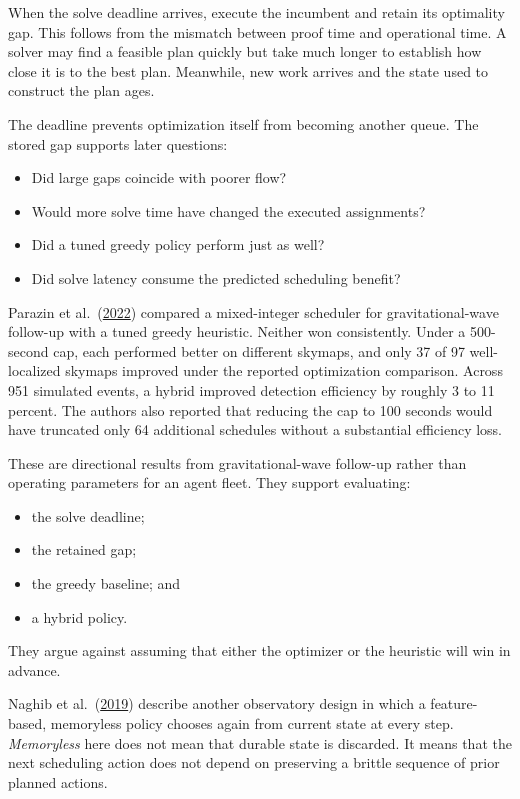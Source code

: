 When the solve deadline arrives, execute the incumbent and retain its optimality gap. This follows from the mismatch between proof time and operational time. A solver may find a feasible plan quickly but take much longer to establish how close it is to the best plan. Meanwhile, new work arrives and the state used to construct the plan ages.

The deadline prevents optimization itself from becoming another queue. The stored gap supports later questions:

\begin{itemize}
\tightlist
\item
  Did large gaps coincide with poorer flow?
\item
  Would more solve time have changed the executed assignments?
\item
  Did a tuned greedy policy perform just as well?
\item
  Did solve latency consume the predicted scheduling benefit?
\end{itemize}

Parazin et al.~(\href{https://arxiv.org/abs/2203.00013}{2022}) compared a mixed-integer scheduler for gravitational-wave follow-up with a tuned greedy heuristic. Neither won consistently. Under a 500-second cap, each performed better on different skymaps, and only 37 of 97 well-localized skymaps improved under the reported optimization comparison. Across 951 simulated events, a hybrid improved detection efficiency by roughly 3 to 11 percent. The authors also reported that reducing the cap to 100 seconds would have truncated only 64 additional schedules without a substantial efficiency loss.

These are directional results from gravitational-wave follow-up rather than operating parameters for an agent fleet. They support evaluating:

\begin{itemize}
\tightlist
\item
  the solve deadline;
\item
  the retained gap;
\item
  the greedy baseline; and
\item
  a hybrid policy.
\end{itemize}

They argue against assuming that either the optimizer or the heuristic will win in advance.

Naghib et al.~(\href{https://arxiv.org/abs/1810.04815}{2019}) describe another observatory design in which a feature-based, memoryless policy chooses again from current state at every step. \emph{Memoryless} here does not mean that durable state is discarded. It means that the next scheduling action does not depend on preserving a brittle sequence of prior planned actions.


